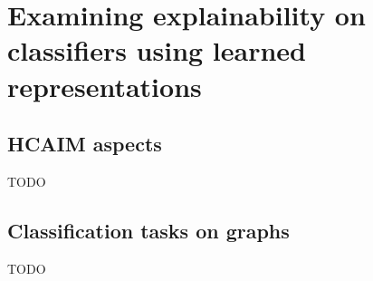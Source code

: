 \chapter{Examining explainability on classifiers using learned representations}
\label{sec:Explainability}

\section{HCAIM aspects}
TODO

\section{Classification tasks on graphs}
TODO
